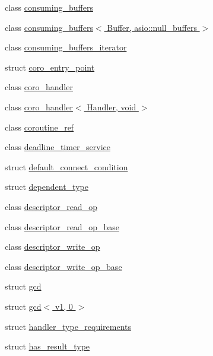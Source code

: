 \begin{DoxyCompactItemize}
\item 
class \hyperlink{classasio_1_1detail_1_1consuming__buffers}{consuming\+\_\+buffers}
\item 
class \hyperlink{classasio_1_1detail_1_1consuming__buffers_3_01_buffer_00_01asio_1_1null__buffers_01_4}{consuming\+\_\+buffers$<$ Buffer, asio\+::null\+\_\+buffers $>$}
\item 
class \hyperlink{classasio_1_1detail_1_1consuming__buffers__iterator}{consuming\+\_\+buffers\+\_\+iterator}
\item 
struct \hyperlink{structasio_1_1detail_1_1coro__entry__point}{coro\+\_\+entry\+\_\+point}
\item 
class \hyperlink{classasio_1_1detail_1_1coro__handler}{coro\+\_\+handler}
\item 
class \hyperlink{classasio_1_1detail_1_1coro__handler_3_01_handler_00_01void_01_4}{coro\+\_\+handler$<$ Handler, void $>$}
\item 
class \hyperlink{classasio_1_1detail_1_1coroutine__ref}{coroutine\+\_\+ref}
\item 
class \hyperlink{classasio_1_1detail_1_1deadline__timer__service}{deadline\+\_\+timer\+\_\+service}
\item 
struct \hyperlink{structasio_1_1detail_1_1default__connect__condition}{default\+\_\+connect\+\_\+condition}
\item 
struct \hyperlink{structasio_1_1detail_1_1dependent__type}{dependent\+\_\+type}
\item 
class \hyperlink{classasio_1_1detail_1_1descriptor__read__op}{descriptor\+\_\+read\+\_\+op}
\item 
class \hyperlink{classasio_1_1detail_1_1descriptor__read__op__base}{descriptor\+\_\+read\+\_\+op\+\_\+base}
\item 
class \hyperlink{classasio_1_1detail_1_1descriptor__write__op}{descriptor\+\_\+write\+\_\+op}
\item 
class \hyperlink{classasio_1_1detail_1_1descriptor__write__op__base}{descriptor\+\_\+write\+\_\+op\+\_\+base}
\item 
struct \hyperlink{structasio_1_1detail_1_1gcd}{gcd}
\item 
struct \hyperlink{structasio_1_1detail_1_1gcd_3_01v1_00_010_01_4}{gcd$<$ v1, 0 $>$}
\item 
struct \hyperlink{structasio_1_1detail_1_1handler__type__requirements}{handler\+\_\+type\+\_\+requirements}
\item 
struct \hyperlink{structasio_1_1detail_1_1has__result__type}{has\+\_\+result\+\_\+type}
\item 

\end{DoxyCompactItemize}
